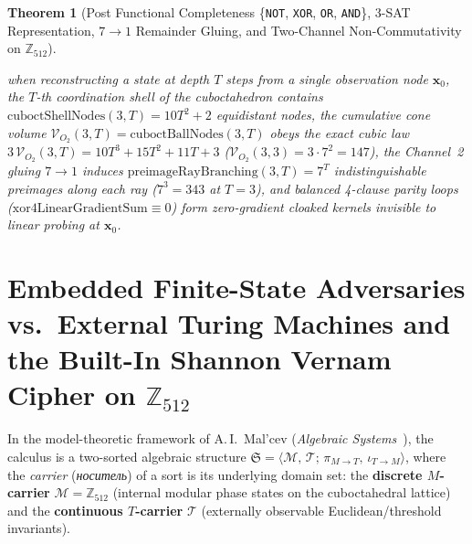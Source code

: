 \documentclass[11pt,a4paper]{article}
\theoremstyle{plain}
\newtheorem{theorem}{Theorem}[section]
\theoremstyle{definition}
\begin{document}
\begin{theorem}[Post Functional Completeness \{\texttt{NOT}, \texttt{XOR}, \texttt{OR}, \texttt{AND}\}, 3-SAT Representation, $7\to 1$ Remainder Gluing, and Two-Channel Non-Commutativity on $\mathbb{Z}_{512}$]
\begin{enumerate}[label=\textbf{(\roman*)},leftmargin=*]
  when reconstructing a state at depth $T$ steps from a single observation node $\mathbf{x}_0$, the $T$-th coordination shell of the cuboctahedron contains $\mathrm{cuboctShellNodes}(3,T)=10T^2+2$ equidistant nodes, the cumulative cone volume $\mathcal{V}_{O_2}(3,T)=\mathrm{cuboctBallNodes}(3,T)$ obeys the exact cubic law $3\,\mathcal{V}_{O_2}(3,T)=10T^3+15T^2+11T+3$ ($\mathcal{V}_{O_2}(3,3)=3\cdot 7^2=147$), the Channel~2 gluing $7\to 1$ induces $\mathrm{preimageRayBranching}(3,T)=7^T$ indistinguishable preimages along each ray ($7^3=343$ at $T=3$), and balanced 4-clause parity loops ($\mathrm{xor4LinearGradientSum}\equiv 0$) form zero-gradient cloaked kernels invisible to linear probing at $\mathbf{x}_0$.
\end{enumerate}
\end{theorem}

\section{Embedded Finite-State Adversaries vs.\ External Turing Machines and the Built-In Shannon Vernam Cipher on \texorpdfstring{$\mathbb{Z}_{512}$}{Z512}}
\label{sec:embedded-adversary-vernam}

In the model-theoretic framework of A.\,I.~Mal'cev (\emph{Algebraic Systems}~\cite{Malcev1973}), the calculus is a two-sorted algebraic structure $\mathfrak{S} = \langle \mathcal{M},\,\mathcal{T};\,\pi_{M\to T},\,\iota_{T\to M}\rangle$, where the \emph{carrier} (\emph{носитель}) of a sort is its underlying domain set: the \textbf{discrete $M$-carrier} $\mathcal{M} = \mathbb{Z}_{512}$ (internal modular phase states on the cuboctahedral lattice) and the \textbf{continuous $T$-carrier} $\mathcal{T}$ (externally observable Euclidean/threshold invariants).
\end{document}
